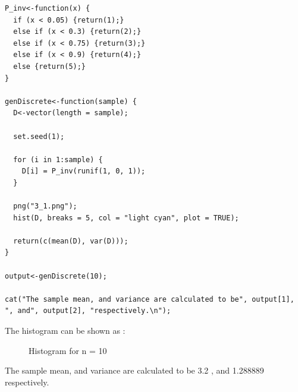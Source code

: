 \documentclass[11pt]{article}
\begin{document}
\newpage


\begin{lstlisting}
P_inv<-function(x) {
  if (x < 0.05) {return(1);}
  else if (x < 0.3) {return(2);}
  else if (x < 0.75) {return(3);}
  else if (x < 0.9) {return(4);}
  else {return(5);}
}

genDiscrete<-function(sample) {
  D<-vector(length = sample);

  set.seed(1);

  for (i in 1:sample) {
    D[i] = P_inv(runif(1, 0, 1));
  }

  png("3_1.png");
  hist(D, breaks = 5, col = "light cyan", plot = TRUE);

  return(c(mean(D), var(D)));
}

output<-genDiscrete(10);

cat("The sample mean, and variance are calculated to be", output[1], ", and", output[2], "respectively.\n");

\end{lstlisting}
\newpage
{}

The histogram can be shown as :

\begin{figure}[H]
  \centering
    \caption{Histogram for n = 10}
\end{figure}

The sample mean, and variance are calculated to be 3.2 , and 1.288889 respectively.

\newpage
\end{document}
